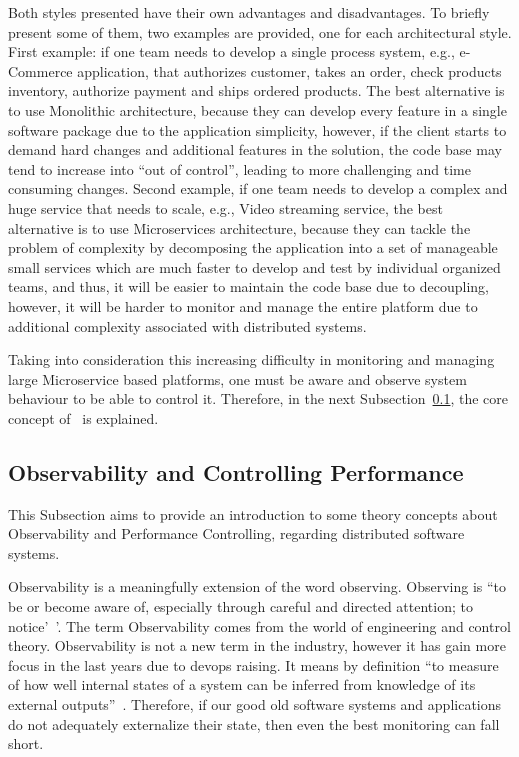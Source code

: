 Both styles presented have their own advantages and disadvantages. To briefly present some of them, two examples are provided, one for each architectural style. First example: if one team needs to develop a single process system, e.g., e-Commerce application, that authorizes customer, takes an order, check products inventory, authorize payment and ships ordered products. The best alternative is to use Monolithic architecture, because they can develop every feature in a single software package due to the application simplicity, however, if the client starts to demand hard changes and additional features in the solution, the code base may tend to increase into ``out of control'', leading to more challenging and time consuming changes. Second example, if one team needs to develop a complex and huge service that needs to scale, e.g., Video streaming service, the best alternative is to use Microservices architecture, because they can tackle the problem of complexity by decomposing the application into a set of manageable small services which are much faster to develop and test by individual organized teams, and thus, it will be easier to maintain the code base due to decoupling, however, it will be harder to monitor and manage the entire platform due to additional complexity associated with distributed systems.

Taking into consideration this increasing difficulty in monitoring and managing large Microservice based platforms, one must be aware and observe system behaviour to be able to control it. Therefore, in the next Subsection~\ref{subsec:observability_and_controlling_performance}, the core concept of~ is explained.

\subsection{Observability and Controlling Performance}
\label{subsec:observability_and_controlling_performance}

This Subsection aims to provide an introduction to some theory concepts about Observability and Performance Controlling, regarding distributed software systems.

Observability is a meaningfully extension of the word observing. Observing is ``to be or become aware of, especially through careful and directed attention; to notice'~'\cite{observing_definition}. The term Observability comes from the world of engineering and control theory. Observability is not a new term in the industry, however it has gain more focus in the last years due to \gls{devops} raising. It means by definition ``to measure of how well internal states of a system can be inferred from knowledge of its external outputs''~\cite{observability}. Therefore, if our good old software systems and applications do not adequately externalize their state, then even the best monitoring can fall short.

